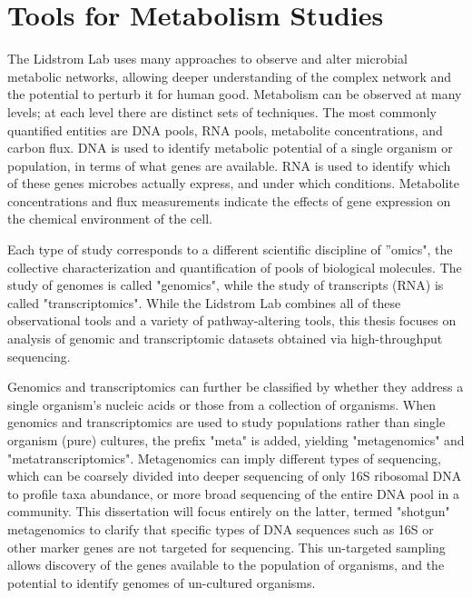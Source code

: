 \section{Tools for Metabolism Studies}
The Lidstrom Lab uses many approaches to observe and alter microbial metabolic networks, allowing deeper understanding of the complex network and the potential to perturb it for human good.
Metabolism can be observed at many levels; at each level there are distinct sets of techniques. %
The most commonly quantified entities are DNA pools, RNA pools, metabolite concentrations, and carbon flux.
DNA is used to identify metabolic potential of a single organism or population, in terms of what genes are available.
RNA is used to identify which of these genes microbes actually express, and under which conditions.
Metabolite concentrations and flux measurements indicate the effects of gene expression on the chemical environment of the cell.

Each type of study corresponds to a different scientific discipline of ''omics", the collective characterization and quantification of pools of biological molecules.
The study of genomes is called "genomics", while the study of transcripts (RNA) is called "transcriptomics".
While the Lidstrom Lab combines all of these observational tools and a variety of pathway-altering tools, this thesis focuses on analysis of genomic and transcriptomic datasets obtained via high-throughput sequencing.


Genomics and transcriptomics can further be classified by whether they address a single organism's nucleic acids or those from a collection of organisms.
When genomics and transcriptomics are used to study populations rather than single organism (pure) cultures, the prefix "meta" is added, yielding "metagenomics" and "metatranscriptomics".
Metagenomics can imply different types of sequencing, which can be coarsely divided into deeper sequencing of only 16S ribosomal DNA to profile taxa abundance, or more broad sequencing of the entire DNA pool in a community.
This dissertation will focus entirely on the latter, termed "shotgun" metagenomics to clarify that specific types of DNA sequences such as 16S or other marker genes are not targeted for sequencing.
This un-targeted sampling allows discovery of the genes available to the population of organisms, and the potential to identify genomes of un-cultured organisms.

